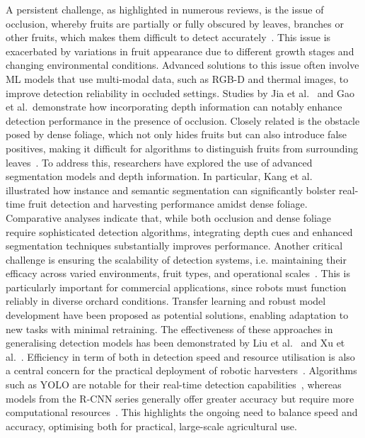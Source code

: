 \documentclass[a4paper,fleqn]{cas-dc}
\begin{document}
A persistent challenge, as highlighted in numerous reviews, is the issue of occlusion, whereby fruits are partially or fully obscured by leaves, branches or other fruits, which makes them difficult to detect accurately~\cite{lu2020survey, yu2020real}. This issue is exacerbated by variations in fruit appearance due to different growth stages and changing environmental conditions. Advanced solutions to this issue often involve ML models that use multi-modal data, such as RGB-D and thermal images, to improve detection reliability in occluded settings. Studies by Jia et al.~\cite{jia2020detection} and Gao et al.~\cite{gao2020multi}demonstrate how incorporating depth information can notably enhance detection performance in the presence of occlusion.
Closely related is the obstacle posed by dense foliage, which not only hides fruits but can also introduce false positives, making it difficult for algorithms to distinguish fruits from surrounding leaves~\cite{wan2020faster, fu2020faster}. To address this, researchers have explored the use of advanced segmentation models and depth information. In particular, Kang et al.~\cite{kang2020fruit, kang2020real} illustrated how instance and semantic segmentation can significantly bolster real-time fruit detection and harvesting performance amidst dense foliage. Comparative analyses indicate that, while both occlusion and dense foliage require sophisticated detection algorithms, integrating depth cues and enhanced segmentation techniques substantially improves performance.
Another critical challenge is ensuring the scalability of detection systems, i.e. maintaining their efficacy across varied environments, fruit types, and operational scales~\cite{yu2019fruit, tu2020passion}. This is particularly important for commercial applications, since robots must function reliably in diverse orchard conditions. Transfer learning and robust model development have been proposed as potential solutions, enabling adaptation to new tasks with minimal retraining. The effectiveness of these approaches in generalising detection models has been demonstrated by Liu et al.~\cite{liu2016method} and Xu et al.~\cite{xu2019real}.
Efficiency in term of both in detection speed and resource utilisation is also a central concern for the practical deployment of robotic harvesters~\cite{ge2019fruit, lin2020color}. Algorithms such as YOLO are notable for their real-time detection capabilities~\cite{liu2020yolo, lawal2021tomato}, whereas models from the R-CNN series generally offer greater accuracy but require more computational resources~\cite{fu2018kiwifruit, chu2021deep}. This highlights the ongoing need to balance speed and accuracy, optimising both for practical, large-scale agricultural use.
\end{document}
